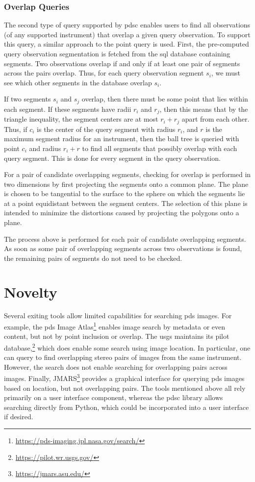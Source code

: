 \documentclass[twocolumn]{extarticle}
\begin{document}
\subsubsection*{Overlap Queries}

The second type of query supported by \ac{pdsc} enables users to find all
observations (of any supported instrument) that overlap a given query
observation. To support this query, a similar approach to the point query is
used. First, the pre-computed query observation segmentation is fetched from the
\ac{sql} database containing segments. Two observations overlap if and only if
at least one pair of segments across the pairs overlap. Thus, for each query
observation segment $s_i$, we must see which other segments in the database
overlap $s_i$.

If two segments $s_i$ and $s_j$ overlap, then there must be some point that lies
within each segment. If these segments have radii $r_i$ and $r_j$, then this
means that by the triangle inequality, the segment centers are at most $r_i +
r_j$ apart from each other. Thus, if $c_i$ is the center of the query segment
with radius $r_i$, and $r$ is the maximum segment radius for an instrument, then
the ball tree is queried with point $c_i$ and radius $r_i + r$ to find all
segments that possibly overlap with each query segment. This is done for every
segment in the query observation.

For a pair of candidate overlapping segments, checking for overlap is performed
in two dimensions by first projecting the segments onto a common plane. The
plane is chosen to be tangential to the surface to the sphere on which the
segments lie at a point equidistant between the segment centers. The selection
of this plane is intended to minimize the distortions caused by projecting the
polygons onto a plane.

The process above is performed for each pair of candidate overlapping segments.
As soon as some pair of overlapping segments across two observations is found,
the remaining pairs of segments do not need to be checked.

\section*{Novelty}

Several exiting tools allow limited capabilities for searching \ac{pds} images.
For example, the \ac{pds} Image
Atlas\footnote{\url{https://pds-imaging.jpl.nasa.gov/search/}} enables image
search by metadata or even content, but not by point inclusion or overlap. The
\ac{usgs} maintains its \ac{pilot}
database,\footnote{\url{https://pilot.wr.usgs.gov/}} which does enable some
search using image location. In particular, one can query to find overlapping
stereo pairs of images from the same instrument. However, the search does not
enable searching for overlapping pairs across images. Finally,
JMARS\footnote{\url{https://jmars.asu.edu/}} provides a graphical interface for
querying \ac{pds} images based on location, but not overlapping pairs. The tools
mentioned above all rely primarily on a user interface component, whereas the
\ac{pdsc} library allows searching directly from Python, which could be
incorporated into a user interface if desired.
\end{document}
